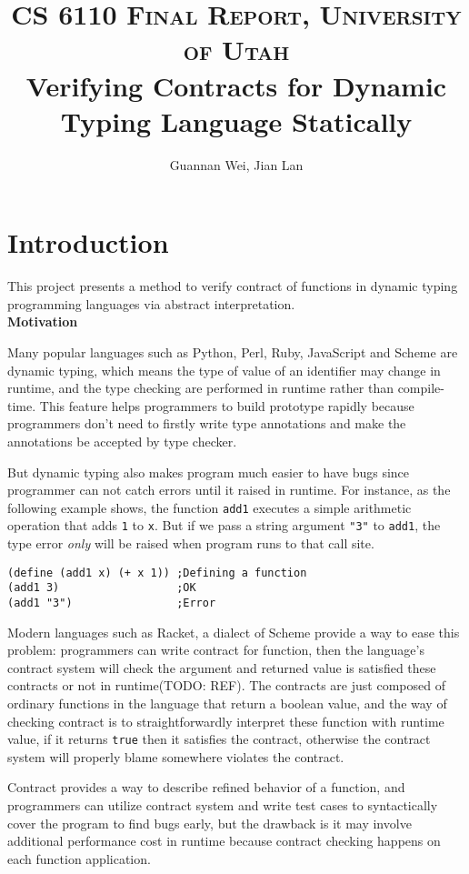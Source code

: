 \documentclass[paper=a4, fontsize=11pt]{scrartcl} %
\title{	
\normalfont \normalsize 
\textsc{CS 6110 Final Report, University of Utah} \\ [25pt] %
\huge Verifying Contracts for Dynamic Typing Language Statically \\ %
}
\author{Guannan Wei, Jian Lan} %
\numberwithin{equation}{section} %
\numberwithin{figure}{section} %
\numberwithin{table}{section} %
\begin{document}
\maketitle %

\section{Introduction}

This project presents a method to verify contract of functions in dynamic typing programming languages via abstract interpretation. \\

\textbf{Motivation}

Many popular languages such as Python, Perl, Ruby, JavaScript and Scheme are dynamic typing, which means the type of value of an identifier may change in runtime, and the type checking are performed in runtime rather than compile-time. This feature helps programmers to build prototype rapidly because programmers don't need to firstly write type annotations and make the annotations be accepted by type checker.

But dynamic typing also makes program much easier to have bugs since programmer can not catch errors until it raised in runtime. For instance, as the following example shows, the function \texttt{add1} executes a simple arithmetic operation that adds \texttt{1} to \texttt{x}. But if we pass a string argument \texttt{"3"} to \texttt{add1}, the type error \textit{only} will be raised when program runs to that call site.

\begin{verbatim}
(define (add1 x) (+ x 1)) ;Defining a function
(add1 3)                  ;OK
(add1 "3")                ;Error
\end{verbatim}

Modern languages such as Racket, a dialect of Scheme provide a way to ease this problem: programmers can write contract for function, then the language's contract system will check the argument and returned value is satisfied these contracts or not in runtime(TODO: REF). The contracts are just composed of ordinary functions in the language that return a boolean value, and the way of checking contract is to straightforwardly interpret these function with runtime value, if it returns \texttt{true} then it satisfies the contract, otherwise the contract system will properly blame somewhere violates the contract.

Contract provides a way to describe refined behavior of a function, and programmers can utilize contract system and write test cases to syntactically cover the program to find bugs early, but the drawback is it may involve additional performance cost in runtime because contract checking happens on each function application.
\end{document}
